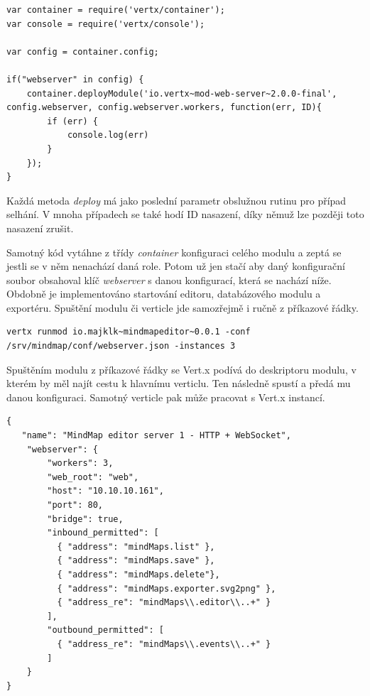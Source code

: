\begin{lstlisting}
var container = require('vertx/container');
var console = require('vertx/console');

var config = container.config;

if("webserver" in config) {
	container.deployModule('io.vertx~mod-web-server~2.0.0-final', config.webserver, config.webserver.workers, function(err, ID){
		if (err) {
			console.log(err)
		}
	});
}
\end{lstlisting}

Každá metoda \emph{deploy} má jako poslední parametr obslužnou rutinu pro případ selhání. V mnoha případech se také hodí ID nasazení, díky němuž lze později toto nasazení zrušit.

Samotný kód vytáhne z třídy \emph{container} konfiguraci celého modulu a zeptá se jestli se v něm nenachází daná role. Potom už jen stačí aby daný konfigurační soubor obsahoval klíč \emph{webserver} s danou konfigurací, která se nachází níže. Obdobně je implementováno startování editoru, databázového modulu a exportéru. Spuštění modulu či verticle jde samozřejmě i ručně z příkazové řádky.

\begin{lstlisting}[caption=Spuštění modulu z příkazové řádky]
vertx runmod io.majklk~mindmapeditor~0.0.1 -conf /srv/mindmap/conf/webserver.json -instances 3
\end{lstlisting}

Spuštěním modulu z příkazové řádky se Vert.x podívá do deskriptoru modulu, v kterém by měl najít cestu k hlavnímu verticlu. Ten následně spustí a předá mu danou konfiguraci. Samotný verticle pak může pracovat s Vert.x instancí.

\begin{lstlisting}[caption=Konfigurace serveru 1]
{
   "name": "MindMap editor server 1 - HTTP + WebSocket",
    "webserver": {
        "workers": 3,
        "web_root": "web",
        "host": "10.10.10.161",
        "port": 80,
        "bridge": true,
        "inbound_permitted": [
          { "address": "mindMaps.list" },
          { "address": "mindMaps.save" },
          { "address": "mindMaps.delete"},
          { "address": "mindMaps.exporter.svg2png" },
          { "address_re": "mindMaps\\.editor\\..+" }
        ],
        "outbound_permitted": [
          { "address_re": "mindMaps\\.events\\..+" }
        ]
    }
}
\end{lstlisting}

